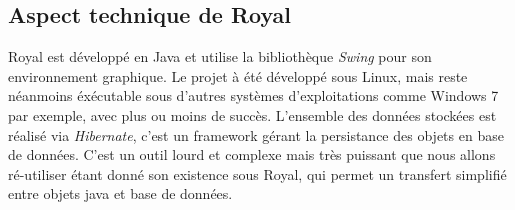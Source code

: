 \subsection{Aspect technique de Royal}
Royal est développé en Java et utilise la bibliothèque \emph{Swing} pour son environnement graphique. 
Le projet à été développé sous Linux, mais reste néanmoins éxécutable sous d'autres systèmes d'exploitations comme Windows 7 par exemple, avec plus ou moins de succès. 
L'ensemble des données stockées est réalisé via \emph{Hibernate}, c'est un framework gérant la persistance des objets en base de données. 
C'est un outil lourd et complexe mais très puissant que nous allons ré-utiliser étant donné son existence sous Royal, qui permet un transfert simplifié entre objets java et base de données.

